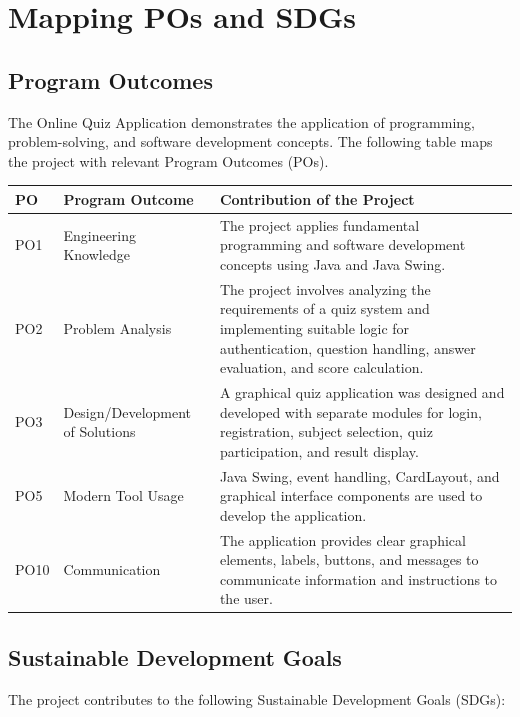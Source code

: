 \documentclass[11pt,a4paper]{report}  %
\begin{document}
\section{Mapping POs and SDGs}

\subsection{Program Outcomes}

The Online Quiz Application demonstrates the application of programming, problem-solving, and software development concepts. The following table maps the project with relevant Program Outcomes (POs).

\begin{longtable}{|p{2cm}|p{4cm}|p{8cm}|}
\hline
\textbf{PO} & \textbf{Program Outcome} & \textbf{Contribution of the Project} \\
\hline

PO1 & Engineering Knowledge & The project applies fundamental programming and software development concepts using Java and Java Swing. \\
\hline

PO2 & Problem Analysis & The project involves analyzing the requirements of a quiz system and implementing suitable logic for authentication, question handling, answer evaluation, and score calculation. \\
\hline

PO3 & Design/Development of Solutions & A graphical quiz application was designed and developed with separate modules for login, registration, subject selection, quiz participation, and result display. \\
\hline

PO5 & Modern Tool Usage & Java Swing, event handling, CardLayout, and graphical interface components are used to develop the application. \\
\hline

PO10 & Communication & The application provides clear graphical elements, labels, buttons, and messages to communicate information and instructions to the user. \\
\hline

\end{longtable}

\subsection{Sustainable Development Goals}

The project contributes to the following Sustainable Development Goals (SDGs):
\end{document}
